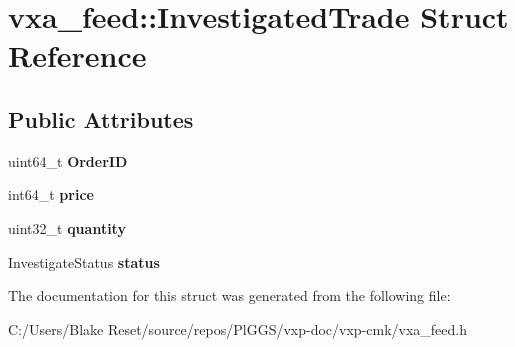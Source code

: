 \hypertarget{structvxa__feed_1_1_investigated_trade}{}\section{vxa\+\_\+feed\+::Investigated\+Trade Struct Reference}
\label{structvxa__feed_1_1_investigated_trade}
\subsection*{Public Attributes}
\begin{DoxyCompactItemize}
\item 
\mbox{\label{structvxa__feed_1_1_investigated_trade_affa51a5a578636f6e4b2ef0d0eb612c0}} 
uint64\+\_\+t {\bfseries Order\+ID}
\item 
\mbox{\label{structvxa__feed_1_1_investigated_trade_a999347abd3ab87366e4529b0f407262e}} 
int64\+\_\+t {\bfseries price}
\item 
\mbox{\label{structvxa__feed_1_1_investigated_trade_a43068b49c70137829b8a5c8bff184ffe}} 
uint32\+\_\+t {\bfseries quantity}
\item 
\mbox{\label{structvxa__feed_1_1_investigated_trade_a6ba89514ce57f3df7de93dc0a2cec791}} 
Investigate\+Status {\bfseries status}
\end{DoxyCompactItemize}


The documentation for this struct was generated from the following file\+:\begin{DoxyCompactItemize}
\item 
C\+:/\+Users/\+Blake Reset/source/repos/\+Pl\+G\+G\+S/vxp-\/doc/vxp-\/cmk/vxa\+\_\+feed.\+h\end{DoxyCompactItemize}
